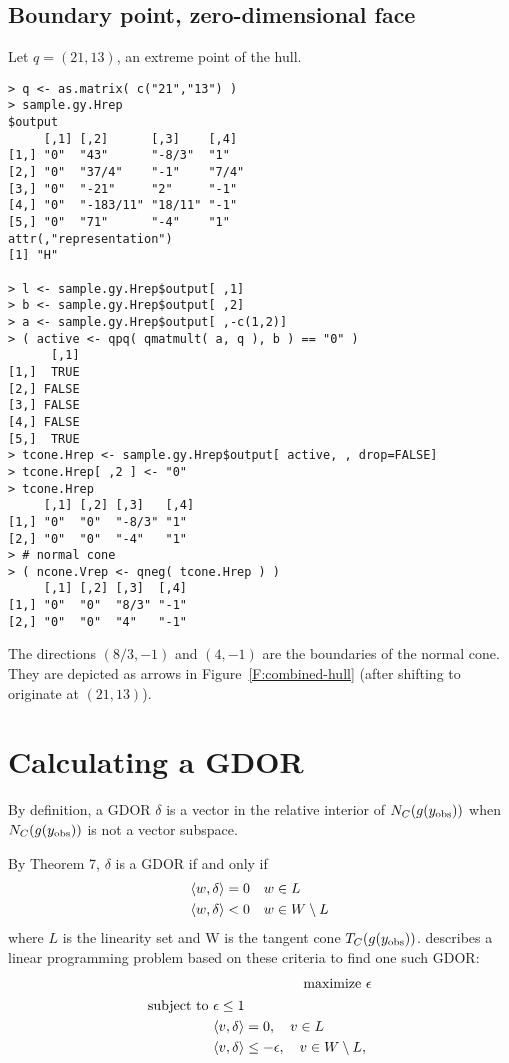 \subsection{Boundary point, zero-dimensional face} \label{S:ncone 0dim}
Let $q = (21,13)$, an extreme point of the hull.
\begin{verbatim}
> q <- as.matrix( c("21","13") )
> sample.gy.Hrep
$output
     [,1] [,2]      [,3]    [,4] 
[1,] "0"  "43"      "-8/3"  "1"  
[2,] "0"  "37/4"    "-1"    "7/4"
[3,] "0"  "-21"     "2"     "-1" 
[4,] "0"  "-183/11" "18/11" "-1" 
[5,] "0"  "71"      "-4"    "1"  
attr(,"representation")
[1] "H"

> l <- sample.gy.Hrep$output[ ,1]
> b <- sample.gy.Hrep$output[ ,2]
> a <- sample.gy.Hrep$output[ ,-c(1,2)]
> ( active <- qpq( qmatmult( a, q ), b ) == "0" )
      [,1]
[1,]  TRUE
[2,] FALSE
[3,] FALSE
[4,] FALSE
[5,]  TRUE
> tcone.Hrep <- sample.gy.Hrep$output[ active, , drop=FALSE]
> tcone.Hrep[ ,2 ] <- "0"
> tcone.Hrep
     [,1] [,2] [,3]   [,4]
[1,] "0"  "0"  "-8/3" "1" 
[2,] "0"  "0"  "-4"   "1" 
> # normal cone
> ( ncone.Vrep <- qneg( tcone.Hrep ) )
     [,1] [,2] [,3]  [,4]
[1,] "0"  "0"  "8/3" "-1"
[2,] "0"  "0"  "4"   "-1"
\end{verbatim}
The directions $(8/3, -1)$ and $(4,-1)$ are the boundaries of the normal cone.
They are depicted as arrows in Figure~\ref{F:combined-hull} (after shifting to 
originate at $(21,13)$).

\section{Calculating a GDOR} \label{S:GDOR calc}
By definition, a GDOR $\delta$ is a vector in the relative interior of $N_C(g(y_{\text{obs}}))$ when
$N_C(g(y_{\text{obs}}))$ is not a vector subspace.  

By Theorem 7, $\delta$ is a GDOR if and only if
\begin{align*}
	\langle w,\delta \rangle & = 0 	\quad w \in L\\
	\langle w,\delta \rangle & < 0 	\quad w \in W \setminus L
\end{align*}
where $L$ is the linearity set and W is the tangent cone $T_C(g(y_{\text{obs}}))$.
\citet{Geyer:gdor} describes a linear programming problem based on these
criteria to find one such GDOR:
\begin{align}
	\text{maximize } 	&\epsilon \label{E:GDOR objv} \\ 
	\begin{split}
	\text{subject to } 	&\epsilon \leq 1 \label{E:GDOR hrep}\\
	&\langle v,\delta \rangle = 0, \quad v \in L \\
	&\langle v,\delta \rangle \leq -\epsilon, \quad v \in W \setminus L,
	\end{split}
\end{align}

